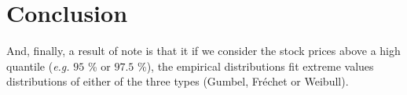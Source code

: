 \chapter{Conclusion}

And, finally, a result of note is that it if we consider the stock prices above a high quantile (\textit{e.g.} $95$ \% or $97.5$ \%), the empirical distributions fit extreme values distributions of either of the three types (Gumbel, Fréchet or Weibull).